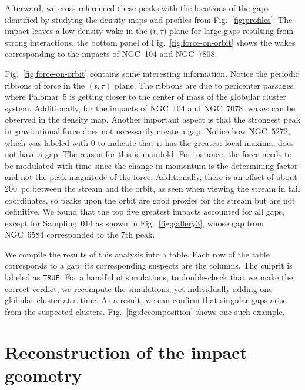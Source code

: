 \documentclass{aa}
\begin{document}
\begin{appendix}
    Afterward, we cross-referenced these peaks with the locations of the gaps identified by studying the density maps and profiles from Fig.~\ref{fig:profiles}. The impact leaves a low-density wake in the ($t,\tau$) plane for large gaps resulting from strong interactions. the bottom panel of Fig.~\ref{fig:force-on-orbit} shows the wakes corresponding to the impacts of NGC~104 and NGC~7808.



    Fig.~\ref{fig:force-on-orbit} contains some interesting information. Notice the periodic ribbons of force in the $(t,\tau)$ plane. The ribbons are due to pericenter passages where Palomar~5 is getting closer to the center of mass of the globular cluster system. Additionally, for the impacts of NGC~104 and NGC~7078, wakes can be observed in the density map. Another important aspect is that the strongest peak in gravitational force does not necessarily create a gap. Notice how NGC~5272, which was labeled with 0 to indicate that it has the greatest local maxima, does not have a gap. The reason for this is manifold. For instance, the force needs to be modulated with time since the change in momentum is the determining factor and not the peak magnitude of the force.  Additionally, there is an offset of about 200~pc between the stream and the orbit, as seen when viewing the stream in tail coordinates, so peaks upon the orbit are good proxies for the stream but are not definitive. We found that the top five greatest impacts accounted for all gaps, except for Sampling~014 as shown in Fig.~\ref{fig:gallery3}, whose gap from NGC~6584 corresponded to the 7th peak. 

    We compile the results of this analysis into a table. Each row of the table corresponds to a gap; its corresponding suspects are the columns. The culprit is labeled as \texttt{TRUE}. For a handful of simulations, to double-check that we make the correct verdict, we recompute the simulations, yet individually adding one globular cluster at a time. As a result, we can confirm that singular gaps arise from the suspected clusters. Fig.~\ref{fig:decomposition} shows one such example. 



    \section{Reconstruction of the impact geometry} \label{sec:reconstruction}


\end{appendix}
\end{document}
